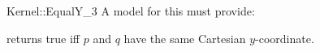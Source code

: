 \begin{ccRefFunctionObjectConcept}{Kernel::EqualY_3}
A model for this must provide:


{returns true iff $p$ and $q$ have the same Cartesian $y$-coordinate.}

\ccSeeAlso
{}\\

\end{ccRefFunctionObjectConcept}
